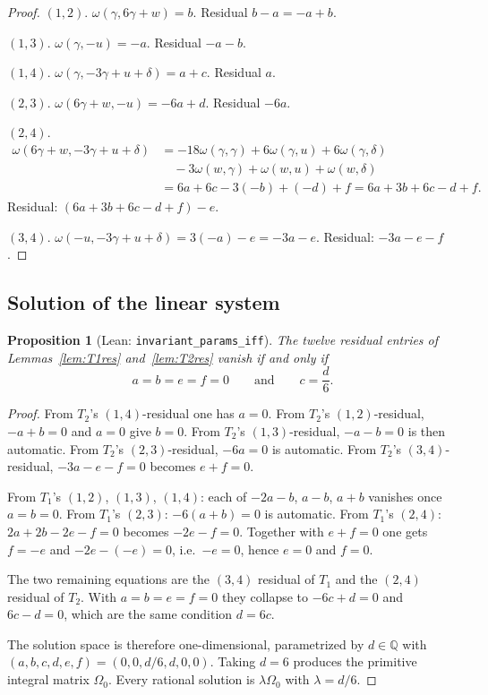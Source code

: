 \documentclass[11pt,a4paper]{article}
\newtheorem{proposition}{Proposition}
\theoremstyle{definition}
\theoremstyle{remark}
\newcommand{\Q}{\mathbb{Q}}
\begin{document}
\begin{proof}
$(1,2)$. $\omega(\gamma,6\gamma+w)=b$. Residual $b-a=-a+b$.

$(1,3)$. $\omega(\gamma,-u)=-a$. Residual $-a-b$.

$(1,4)$. $\omega(\gamma,-3\gamma+u+\delta)=a+c$. Residual $a$.

$(2,3)$. $\omega(6\gamma+w,-u)=-6a+d$. Residual $-6a$.

$(2,4)$.
\begin{align*}
\omega(6\gamma+w,-3\gamma+u+\delta)
&=-18\omega(\gamma,\gamma)+6\omega(\gamma,u)+6\omega(\gamma,\delta)\\
&\quad-3\omega(w,\gamma)+\omega(w,u)+\omega(w,\delta)\\
&=6a+6c-3(-b)+(-d)+f=6a+3b+6c-d+f.
\end{align*}
Residual: $(6a+3b+6c-d+f)-e$.

$(3,4)$. $\omega(-u,-3\gamma+u+\delta)=3(-a)-e=-3a-e$. Residual: $-3a-e-f$.
\end{proof}

\subsection{Solution of the linear system}

\begin{proposition}[Lean: \texttt{invariant\_params\_iff}]\label{prop:kernel}
The twelve residual entries of Lemmas~\ref{lem:T1res} and~\ref{lem:T2res} vanish if and only if
\[
a=b=e=f=0\qquad\text{and}\qquad c=\frac{d}{6}.
\]
\end{proposition}

\begin{proof}
From $T_2$'s $(1,4)$-residual one has $a=0$. From $T_2$'s $(1,2)$-residual, $-a+b=0$ and $a=0$ give $b=0$. From $T_2$'s $(1,3)$-residual, $-a-b=0$ is then automatic. From $T_2$'s $(2,3)$-residual, $-6a=0$ is automatic. From $T_2$'s $(3,4)$-residual, $-3a-e-f=0$ becomes $e+f=0$.

From $T_1$'s $(1,2)$, $(1,3)$, $(1,4)$: each of $-2a-b$, $a-b$, $a+b$ vanishes once $a=b=0$. From $T_1$'s $(2,3)$: $-6(a+b)=0$ is automatic. From $T_1$'s $(2,4)$: $2a+2b-2e-f=0$ becomes $-2e-f=0$. Together with $e+f=0$ one gets $f=-e$ and $-2e-(-e)=0$, i.e.\ $-e=0$, hence $e=0$ and $f=0$.

The two remaining equations are the $(3,4)$ residual of $T_1$ and the $(2,4)$ residual of $T_2$. With $a=b=e=f=0$ they collapse to $-6c+d=0$ and $6c-d=0$, which are the same condition $d=6c$.

The solution space is therefore one-dimensional, parametrized by $d\in\Q$ with $(a,b,c,d,e,f)=(0,0,d/6,d,0,0)$. Taking $d=6$ produces the primitive integral matrix $\Omega_0$. Every rational solution is $\lambda\Omega_0$ with $\lambda=d/6$.
\end{proof}
\end{document}
